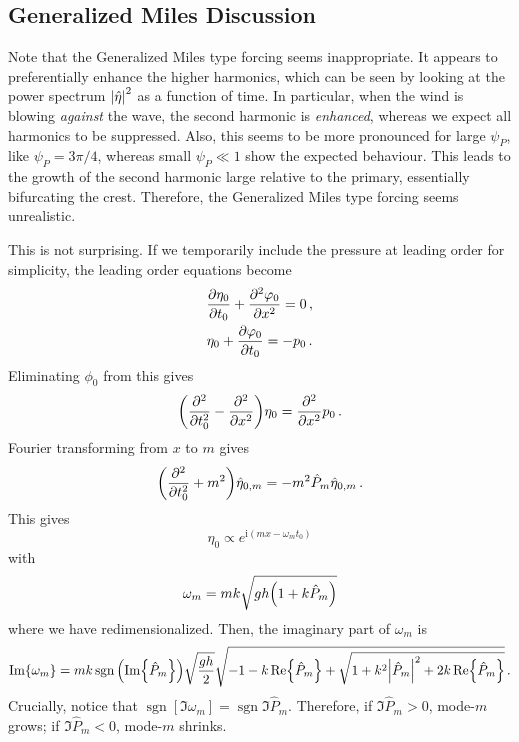 \documentclass{jfm}
\let\Oldsubsection\subsection
\renewcommand{\subsection}{\FloatBarrier\Oldsubsection}
\newcommand{\GenP}{\hat{P}_m}
\DeclareMathOperator{\sgn}{sgn}
\newcommand{\im}{\mathrm{i}}
\begin{document}
\subsection{Generalized Miles Discussion}
Note that the Generalized Miles type forcing seems inappropriate.
It appears to preferentially enhance the higher harmonics, which can be
seen by looking at the power spectrum $\abs{\hat{\eta}}^2$ as a function
of time.
In particular, when the wind is blowing \emph{against} the wave, the
second harmonic is \emph{enhanced}, whereas we expect all harmonics to
be suppressed.
Also, this seems to be more pronounced for large $\psi_P$, like $\psi_P
= 3\pi/4$, whereas small $\psi_P \ll 1$ show the expected behaviour.
This leads to the growth of the second harmonic large relative to the
primary, essentially bifurcating the crest.
Therefore, the Generalized Miles type forcing seems unrealistic.

This is not surprising.
If we temporarily include the pressure at leading order for simplicity,
the leading order equations become
\begin{gather}
  \pdv{\eta_0}{t_0} + \pdv[2]{\varphi_0}{x} = 0 \,, \\
  \eta_0 + \pdv{\varphi_0}{t_0} = -p_0 \,.
\end{gather}
Eliminating $\phi_0$ from this gives
\begin{equation}
  \pqty{\pdv[2]{t_0} - \pdv[2]{x} } \eta_0 = \pdv[2]{x} p_0 \,.
\end{equation}
Fourier transforming from $x$ to $m$ gives
\begin{equation}
  \pqty{\pdv[2]{t_0} + m^2 } \hat{\eta}_{0,m} = -m^2 \GenP
  \hat{\eta}_{0,m} \,.
\end{equation}
This gives
\begin{equation}
  \eta_0 \propto e^{\im(m x - \omega_m t_0)}
\end{equation}
with
\begin{equation}
  \omega_m = mk \sqrt{gh \pqty{1 + k \GenP}}
\end{equation}
where we have redimensionalized.
Then, the imaginary part of $\omega_m$ is
\begin{equation}
  \Im{\omega_m} = mk \sgn \pqty{\Im{\GenP}} \sqrt{\frac{gh}{2}} \sqrt{-1
    - k\Re{\GenP} + \sqrt{1 + k^2 \abs{\GenP}^2 + 2 k \Re{\GenP}}} \,.
\end{equation}
Crucially, notice that $\sgn[\Im{\omega_m}] = \sgn{\Im{\GenP}}$.
Therefore, if $\Im{\GenP}>0$, mode-$m$ grows; if $\Im{\GenP} <
0$, mode-$m$ shrinks.
\end{document}
